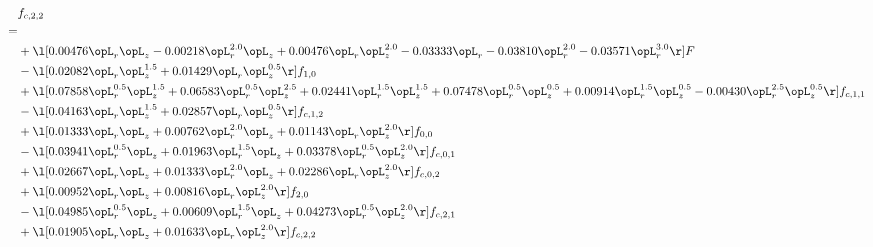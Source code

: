 \begin{alignat}{2} 
\label{eq:f_22_1} 
& f_{c,2,2} \nonumber \\ 
 = \\ 
& + \l[  0.00476 \opL_r \opL_z   -0.00218 \opL_r^{2.0} \opL_z +  0.00476 \opL_r \opL_z^{2.0}   -0.03333 \opL_r   -0.03810 \opL_r^{2.0}   -0.03571 \opL_r^{3.0}  \r] F \nonumber \\ 
& - \l[  0.02082 \opL_r \opL_z^{1.5} +  0.01429 \opL_r \opL_z^{0.5}  \r] f_{1,0} \nonumber \\ 
& + \l[  0.07858 \opL_r^{0.5} \opL_z^{1.5} +  0.06583 \opL_r^{0.5} \opL_z^{2.5} +  0.02441 \opL_r^{1.5} \opL_z^{1.5} +  0.07478 \opL_r^{0.5} \opL_z^{0.5} +  0.00914 \opL_r^{1.5} \opL_z^{0.5}   -0.00430 \opL_r^{2.5} \opL_z^{0.5}  \r] f_{c,1,1} \nonumber \\ 
& - \l[  0.04163 \opL_r \opL_z^{1.5} +  0.02857 \opL_r \opL_z^{0.5}  \r] f_{c,1,2} \nonumber \\ 
& + \l[  0.01333 \opL_r \opL_z +  0.00762 \opL_r^{2.0} \opL_z +  0.01143 \opL_r \opL_z^{2.0}  \r] f_{0,0} \nonumber \\ 
& - \l[  0.03941 \opL_r^{0.5} \opL_z +  0.01963 \opL_r^{1.5} \opL_z +  0.03378 \opL_r^{0.5} \opL_z^{2.0}  \r] f_{c,0,1} \nonumber \\ 
& + \l[  0.02667 \opL_r \opL_z +  0.01333 \opL_r^{2.0} \opL_z +  0.02286 \opL_r \opL_z^{2.0}  \r] f_{c,0,2} \nonumber \\ 
& + \l[  0.00952 \opL_r \opL_z +  0.00816 \opL_r \opL_z^{2.0}  \r] f_{2,0} \nonumber \\ 
& - \l[  0.04985 \opL_r^{0.5} \opL_z +  0.00609 \opL_r^{1.5} \opL_z +  0.04273 \opL_r^{0.5} \opL_z^{2.0}  \r] f_{c,2,1} \nonumber \\ 
& + \l[  0.01905 \opL_r \opL_z +  0.01633 \opL_r \opL_z^{2.0}  \r] f_{c,2,2} \nonumber \\ 
\end{alignat} 


